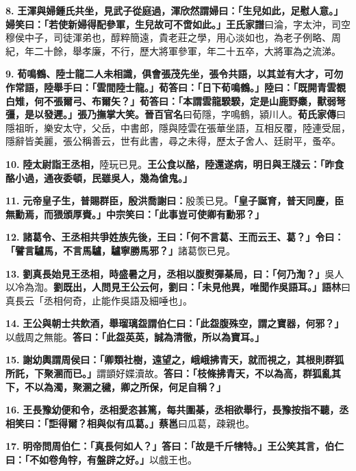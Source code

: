 \textbf{8.} \textbf{王渾與婦鍾氏共坐，見武子從庭過，渾欣然謂婦曰：「生兒如此，足慰人意。」婦笑曰：「若使新婦得配參軍，生兒故可不啻如此。」}{\footnotesize \textbf{王氏家譜}曰淪，字太沖，司空穆侯中子，司徒渾弟也，醇粹簡遠，貴老莊之學，用心淡如也，為老子例略、周紀，年二十餘，舉孝廉，不行，歷大將軍參軍，年二十五卒，大將軍為之流涕。}

\textbf{9.} \textbf{荀鳴鶴、陸士龍二人未相識，俱會張茂先坐，張令共語，以其並有大才，可勿作常語，陸舉手曰：「雲間陸士龍。」荀答曰：「日下荀鳴鶴。」陸曰：「既開青雲覩白雉，何不張爾弓、布爾矢？」荀答曰：「本謂雲龍騤騤，定是山鹿野麋，獸弱弩彊，是以發遲。」張乃撫掌大笑。}{\footnotesize \textbf{晉百官名}曰荀隱，字鳴鶴，潁川人。\textbf{荀氏家傳}曰隱祖昕，樂安太守，父岳，中書郎，隱與陸雲在張華坐語，互相反覆，陸連受屈，隱辭皆美麗，張公稱善云，世有此書，尋之未得，歷太子舍人、廷尉平，蚤卒。}

\textbf{10.} \textbf{陸太尉詣王丞相，}{\footnotesize 陸玩已見。}\textbf{王公食以酪，陸還遂病，明日與王牋云：「昨食酪小過，通夜委頓，民雖吳人，幾為傖鬼。」}

\textbf{11.} \textbf{元帝皇子生，普賜群臣，殷洪喬謝曰：}{\footnotesize 殷羡已見。}\textbf{「皇子誕育，普天同慶，臣無勳焉，而猥頒厚賚。」中宗笑曰：「此事豈可使卿有勳邪？」}

\textbf{12.} \textbf{諸葛令、王丞相共爭姓族先後，王曰：「何不言葛、王而云王、葛？」令曰：「譬言驢馬，不言馬驢，驢寧勝馬邪？」}{\footnotesize 諸葛恢已見。}

\textbf{13.} \textbf{劉真長始見王丞相，時盛暑之月，丞相以腹熨彈棊局，曰：「何乃渹？」}{\footnotesize 吳人以冷為渹。}\textbf{劉既出，人問見王公云何，劉曰：「未見他異，唯聞作吳語耳。」}{\footnotesize \textbf{語林}曰真長云「丞相何奇，止能作吳語及細唾也」。}

\textbf{14.} \textbf{王公與朝士共飲酒，舉瑠璃盌謂伯仁曰：「此盌腹殊空，謂之寶器，何邪？」}{\footnotesize 以戲周之無能。}\textbf{答曰：「此盌英英，誠為清徹，所以為寶耳。」}

\textbf{15.} \textbf{謝幼輿謂周侯曰：「卿類社樹，遠望之，峨峨拂青天，就而視之，其根則群狐所託，下聚溷而已。」}{\footnotesize 謂顗好媟瀆故。}\textbf{答曰：「枝條拂青天，不以為高，群狐亂其下，不以為濁，聚溷之穢，卿之所保，何足自稱？」}

\textbf{16.} \textbf{王長豫幼便和令，丞相愛恣甚篤，每共圍棊，丞相欲舉行，長豫按指不聽，丞相笑曰：「詎得爾？相與似有瓜葛。」}{\footnotesize \textbf{蔡邕}曰瓜葛，疎親也。}

\textbf{17.} \textbf{明帝問周伯仁：「真長何如人？」答曰：「故是千斤犗特。」王公笑其言，伯仁曰：「不如卷角牸，有盤辟之好。」}{\footnotesize 以戲王也。}

